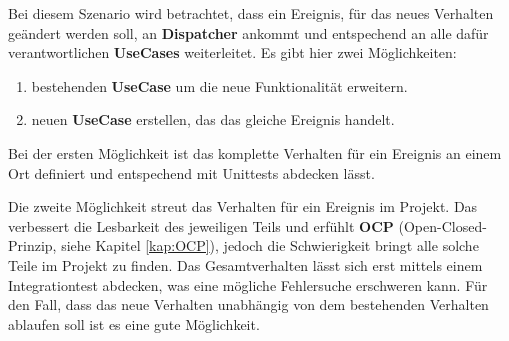 
    Bei diesem Szenario wird betrachtet, dass ein Ereignis, für das neues Verhalten geändert werden soll, an \textbf{Dispatcher} ankommt und entspechend an alle dafür 
    verantwortlichen \textbf{UseCases} weiterleitet. 
    Es gibt hier zwei Möglichkeiten:
    \begin{enumerate}
        \item bestehenden \textbf{UseCase} um die neue Funktionalität erweitern.
        \item neuen \textbf{UseCase}  erstellen, das das gleiche Ereignis handelt.
    \end{enumerate}

    Bei der ersten Möglichkeit ist das komplette Verhalten für ein Ereignis an einem Ort definiert und entspechend mit Unittests abdecken lässt.

    Die zweite Möglichkeit streut das Verhalten für ein Ereignis im Projekt. Das verbessert die Lesbarkeit des jeweiligen Teils und erfühlt \textbf{OCP} (Open-Closed-Prinzip, siehe Kapitel \ref{kap:OCP}),
    jedoch die Schwierigkeit bringt alle solche Teile im Projekt zu finden. Das Gesamtverhalten lässt sich erst mittels
    einem Integrationtest abdecken, was eine mögliche Fehlersuche erschweren kann. 
    Für den Fall, dass das neue Verhalten unabhängig von dem bestehenden Verhalten ablaufen soll ist es eine gute Möglichkeit.